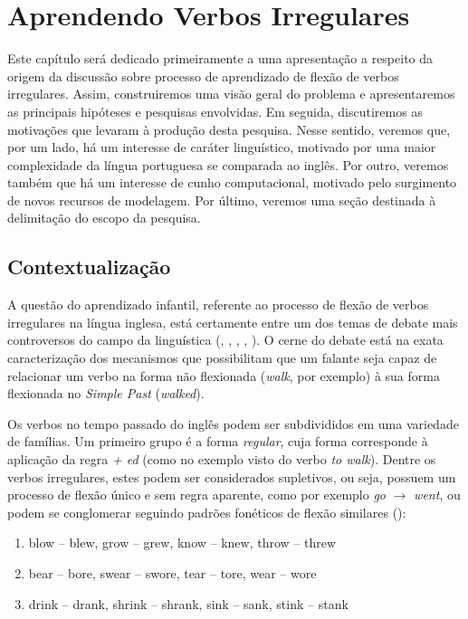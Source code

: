 \chapter{Aprendendo Verbos Irregulares}
\label{ch:01}

Este capítulo será dedicado primeiramente a uma apresentação a respeito da origem da discussão sobre processo de aprendizado de flexão de verbos irregulares.  Assim, construiremos uma visão geral do problema e apresentaremos as principais hipóteses e pesquisas envolvidas. Em seguida, discutiremos as motivações que levaram à produção desta pesquisa. Nesse sentido, veremos que, por um lado, há um interesse de caráter linguístico, motivado por uma maior complexidade da língua portuguesa se comparada ao inglês. Por outro, veremos também que há um interesse de cunho computacional, motivado pelo surgimento de novos recursos de modelagem. Por último, veremos uma seção destinada à delimitação do escopo da pesquisa.

\section{Contextualização}
A questão do aprendizado infantil, referente ao processo de flexão de verbos irregulares na língua inglesa, está certamente entre um dos temas de debate mais controversos  
do campo da linguística (\cite{chomsky:1968}, \cite{Pinker:1999}, \cite{Pinker:1988}, \cite{Albright2003RulesVA}, \cite{kirov:2018}). O cerne do debate está na exata caracterização dos mecanismos que possibilitam que um falante seja capaz de relacionar um verbo na forma não flexionada (\textit{walk}, por exemplo) à sua forma flexionada no \textit{Simple Past} (\textit{walked}).

Os verbos no tempo passado do inglês podem ser subdivididos em uma variedade de famílias. Um primeiro grupo é a forma \textit{regular}, cuja forma corresponde à aplicação da regra \textit{ + ed} (como no exemplo visto do verbo \textit{to walk}). 
Dentre os verbos irregulares, estes podem ser considerados supletivos, ou seja, possuem um processo de flexão único e sem regra aparente, como por exemplo \textit{go} $\rightarrow$ \textit{went}, ou podem se conglomerar seguindo padrões fonéticos de flexão similares (\cite{Nelson:2010}):

\begin{enumerate}
    \item blow – blew, grow – grew, know – knew, throw – threw
    \item bear – bore, swear – swore, tear – tore, wear – wore
    \item drink – drank, shrink – shrank, sink – sank, stink – stank 
\end{enumerate}

